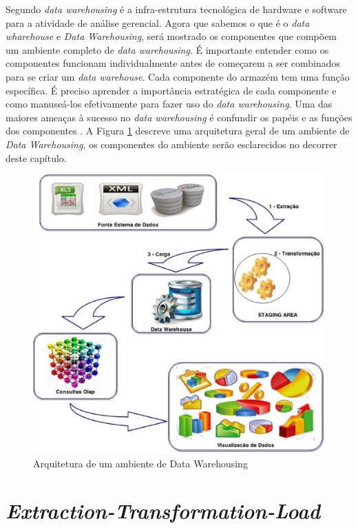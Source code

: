 Segundo \cite{andre2000}  \textit{data warehousing} é a infra-estrutura tecnológica de hardware e software para a atividade de análise gerencial. Agora que sabemos o que é o \textit{data wharehouse} e \textit{Data Warehousing}, será mostrado os componentes que compõem um ambiente completo de \textit{data warehousing}. É importante entender como os componentes funcionam individualmente antes de começarem a ser combinados para se criar um \textit{data warehouse}. Cada componente do armazém tem uma função específica. É preciso aprender a importância estratégica de cada componente e como manuseá-los efetivamente para fazer uso do \textit{data warehousing}. Uma das maiores ameaças à sucesso no \textit{data warehousing} é confundir os papéis e as funções dos componentes \cite{Kimball2002}. A Figura \ref{fig:etl} descreve uma arquitetura geral de um ambiente de \textit{Data Warehousing}, os componentes do ambiente serão esclarecidos no decorrer deste capítulo.

\begin{figure}[h!]
\centering
\includegraphics[keepaspectratio=false,scale=0.50]{figuras/figuras_nilton/etl.eps}
\caption{Arquitetura de um ambiente de Data Warehousing}
\label{fig:etl}
\end{figure}
\FloatBarrier


\section{\textit{Extraction-Transformation-Load}}

